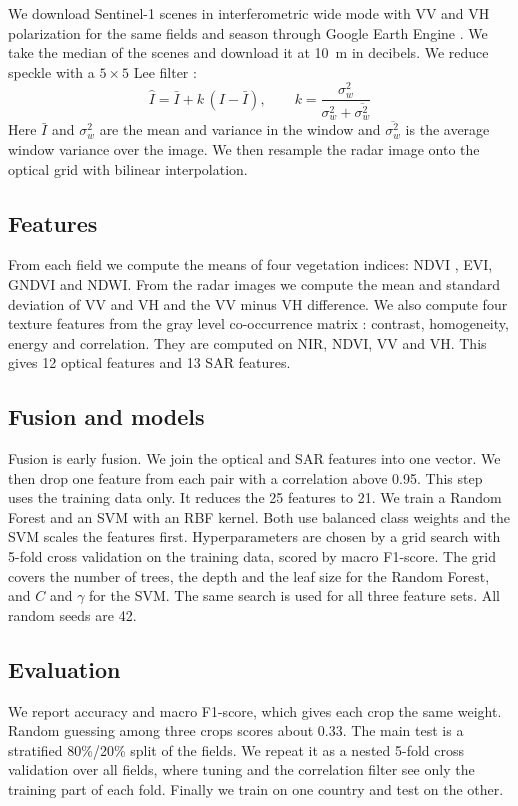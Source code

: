 \documentclass[conference]{IEEEtran}
\begin{document}
We download Sentinel-1 scenes in interferometric wide mode with VV and VH polarization for the same fields and season through Google Earth Engine \cite{gee}. We take the median of the scenes and download it at 10~m in decibels. We reduce speckle with a $5\times5$ Lee filter \cite{lee}:
\begin{equation}
\hat I=\bar I+k\,(I-\bar I),\qquad k=\frac{\sigma_w^2}{\sigma_w^2+\overline{\sigma_w^2}}
\end{equation}
Here $\bar I$ and $\sigma_w^2$ are the mean and variance in the window and $\overline{\sigma_w^2}$ is the average window variance over the image. We then resample the radar image onto the optical grid with bilinear interpolation.

\subsection{Features}
From each field we compute the means of four vegetation indices: NDVI \cite{rouse}, EVI, GNDVI and NDWI. From the radar images we compute the mean and standard deviation of VV and VH and the VV minus VH difference. We also compute four texture features from the gray level co-occurrence matrix \cite{haralick}: contrast, homogeneity, energy and correlation. They are computed on NIR, NDVI, VV and VH. This gives 12 optical features and 13 SAR features.

\subsection{Fusion and models}
Fusion is early fusion. We join the optical and SAR features into one vector. We then drop one feature from each pair with a correlation above 0.95. This step uses the training data only. It reduces the 25 features to 21. We train a Random Forest and an SVM with an RBF kernel. Both use balanced class weights and the SVM scales the features first. Hyperparameters are chosen by a grid search with 5-fold cross validation on the training data, scored by macro F1-score. The grid covers the number of trees, the depth and the leaf size for the Random Forest, and $C$ and $\gamma$ for the SVM. The same search is used for all three feature sets. All random seeds are 42.

\subsection{Evaluation}
We report accuracy and macro F1-score, which gives each crop the same weight. Random guessing among three crops scores about 0.33. The main test is a stratified 80\%/20\% split of the fields. We repeat it as a nested 5-fold cross validation over all fields, where tuning and the correlation filter see only the training part of each fold. Finally we train on one country and test on the other.
\end{document}
